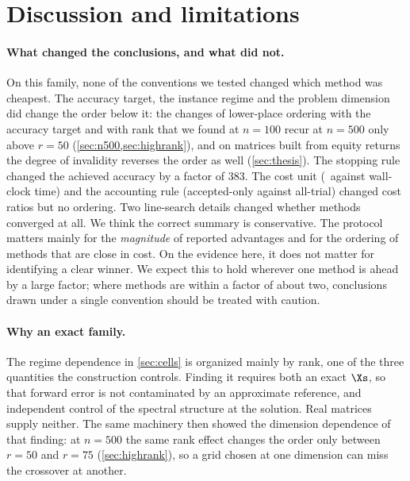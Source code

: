 \section{Discussion and limitations}\label{sec:discussion}

\paragraph{What changed the conclusions, and what did not.}
On this family, none of the conventions we tested changed which method was
cheapest. The accuracy target, the instance regime and the problem dimension
did change the order below it: the changes of lower-place ordering with the
accuracy target and with rank that we found at $n=100$ recur at $n=500$ only
above $r=50$ (\cref{sec:n500,sec:highrank}), and on matrices built from equity
returns the degree of invalidity reverses the order as well
(\cref{sec:thesis}). The stopping rule
changed the achieved accuracy by a factor of 383. The cost unit (\EVDs\ against wall-clock time) and the accounting rule
(accepted-only against all-trial) changed cost ratios but no ordering. Two
line-search details changed whether methods converged at all. We think the
correct summary is conservative. The protocol matters mainly for the
\emph{magnitude} of reported advantages and for the ordering of methods that
are close in cost. On the evidence here, it does not matter for identifying a
clear winner. We expect this to hold wherever one method is ahead by a
large factor; where methods are within a factor of about two, conclusions
drawn under a single convention should be treated with caution.

\paragraph{Why an exact family.}
The regime dependence in \cref{sec:cells} is organized mainly by rank, one of
the three quantities the construction controls. Finding it requires both an
exact $\Xs$, so that forward error is not contaminated by an approximate
reference, and independent control of the spectral structure at the
solution. Real matrices supply neither. The same machinery then showed the
dimension dependence of that finding: at $n=500$ the same rank effect changes
the order only between $r=50$ and $r=75$ (\cref{sec:highrank}), so a grid
chosen at one dimension can miss the crossover at another.

